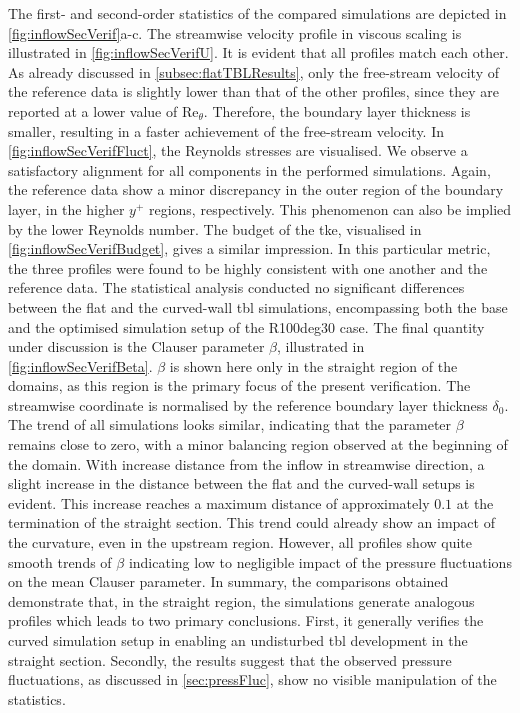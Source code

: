 The first- and second-order statistics of the compared simulations are depicted in \autoref{fig:inflowSecVerif}a-c.
The streamwise velocity profile in viscous scaling is illustrated in \autoref{fig:inflowSecVerifU}.
It is evident that all profiles match each other. 
As already discussed in \autoref{subsec:flatTBLResults}, only the free-stream velocity of the reference data is slightly lower than that of the other profiles, since they are reported at a lower value of $\mathrm{Re}_{\theta}$.
Therefore, the boundary layer thickness is smaller, resulting in a faster achievement of the free-stream velocity.
In \autoref{fig:inflowSecVerifFluct}, the Reynolds stresses are visualised. 
We observe a satisfactory alignment for all components in the performed simulations.
Again, the reference data show a minor discrepancy in the outer region of the boundary layer, in the higher $y^+$ regions, respectively.
This phenomenon can also be implied by the lower Reynolds number.
The budget of the \acrshort{tke}, visualised in \autoref{fig:inflowSecVerifBudget}, gives a similar impression.
In this particular metric, the three profiles were found to be highly consistent with one another and the reference data.
The statistical analysis conducted no significant differences between the flat and the curved-wall \acrshort{tbl} simulations, encompassing both the base and the optimised simulation setup of the R100deg30 case.
The final quantity under discussion is the Clauser parameter $\beta$, illustrated in \autoref{fig:inflowSecVerifBeta}.
$\beta$ is shown here only in the straight region of the domains, as this region is the primary focus of the present verification.
The streamwise coordinate is normalised by the reference boundary layer thickness $\delta_0$.
The trend of all simulations looks similar, indicating that the parameter $\beta$ 
remains close to zero, with a minor balancing region observed at the beginning of the domain. 
With increase distance from the inflow in streamwise direction, a slight increase in the distance between the flat and the curved-wall setups is evident.
This increase reaches a maximum distance of approximately $0.1$ at the termination of the straight section.
This trend could already show an impact of the curvature, even in the upstream region.
However, all profiles show quite smooth trends of $\beta$ indicating low to negligible impact of the pressure fluctuations on the mean Clauser parameter.
In summary, the comparisons obtained demonstrate that, in the straight region, the simulations generate analogous profiles which leads to two primary conclusions.
First, it generally verifies the curved simulation setup in enabling an undisturbed \acrshort{tbl} development in the straight section.
Secondly, the results suggest that the observed pressure fluctuations, as discussed in \autoref{sec:pressFluc}, show no visible manipulation of the statistics.
\newpage


